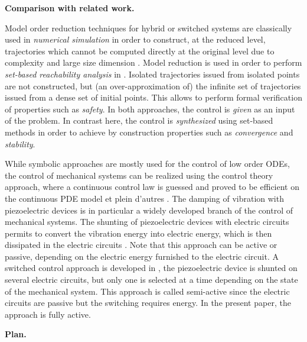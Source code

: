 \vspace{1em}

{\bf Comparison with related work.}

Model order reduction techniques for hybrid or switched systems are classically used in
{\em numerical simulation}   in order to construct, at the reduced level,
trajectories  which cannot be computed directly at the original level
due to complexity and large size dimension \cite{Antoulas-Sorensen-Gugercin00,chinesta2011short}.
Model reduction is used in order to perform  
{\em set-based reachability analysis} in \cite{Han-Krogh04}.
Isolated trajectories issued from  isolated points are not constructed,
but  (an over-approximation of) the infinite set of trajectories
issued  from a dense set of initial points. This allows to perform formal verification
of properties such as {\em safety}. In both approaches, the control is {\em given}
as an input of the problem. 
In contrast here, the control is {\em synthesized} using set-based methods
in order to achieve by construction properties such as 
{\em convergence} and {\em stability}. 


While symbolic approaches are mostly used for the control of low order
ODEs, the control of mechanical systems can be realized using the control theory approach, 
where a continuous control law is guessed and proved to be efficient on the continuous
PDE model \cite{shahruz1998,azam1994nonlinear} {\todo et plein d'autres \cite{???}}. 
The damping of vibration with 
piezoelectric devices is in particular a widely developed branch of the control
of mechanical systems. The shunting of piezoelectric devices with
electric circuits permits to convert the vibration energy into electric energy,
which is then dissipated in the electric circuits \cite{hagood1991}.
Note that this approach can be active or passive, depending on the electric energy furnished
to the electric circuit.
A switched control approach is developed in \cite{clark2000vibration,ramaratnam2004semi}, 
the piezoelectric
device is shunted on several electric circuits, but only one is selected at a time depending
on the state of the mechanical system. This approach is called semi-active since the electric
circuits are passive but the switching requires energy.
In the present paper, the approach is fully active.

\vspace{1em}

{\bf Plan.}


